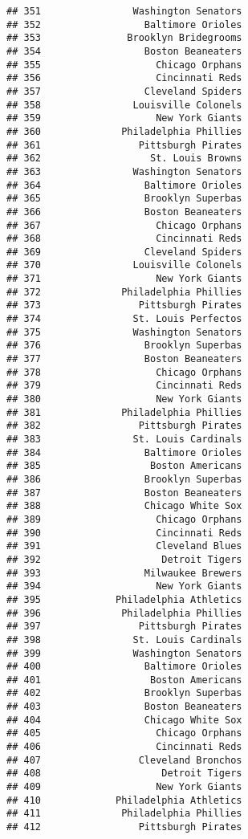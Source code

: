 \documentclass[]{article}
\begin{document}
\begin{verbatim}
## 351                Washington Senators
## 352                  Baltimore Orioles
## 353               Brooklyn Bridegrooms
## 354                  Boston Beaneaters
## 355                    Chicago Orphans
## 356                    Cincinnati Reds
## 357                  Cleveland Spiders
## 358                Louisville Colonels
## 359                    New York Giants
## 360              Philadelphia Phillies
## 361                 Pittsburgh Pirates
## 362                   St. Louis Browns
## 363                Washington Senators
## 364                  Baltimore Orioles
## 365                  Brooklyn Superbas
## 366                  Boston Beaneaters
## 367                    Chicago Orphans
## 368                    Cincinnati Reds
## 369                  Cleveland Spiders
## 370                Louisville Colonels
## 371                    New York Giants
## 372              Philadelphia Phillies
## 373                 Pittsburgh Pirates
## 374                St. Louis Perfectos
## 375                Washington Senators
## 376                  Brooklyn Superbas
## 377                  Boston Beaneaters
## 378                    Chicago Orphans
## 379                    Cincinnati Reds
## 380                    New York Giants
## 381              Philadelphia Phillies
## 382                 Pittsburgh Pirates
## 383                St. Louis Cardinals
## 384                  Baltimore Orioles
## 385                   Boston Americans
## 386                  Brooklyn Superbas
## 387                  Boston Beaneaters
## 388                  Chicago White Sox
## 389                    Chicago Orphans
## 390                    Cincinnati Reds
## 391                    Cleveland Blues
## 392                     Detroit Tigers
## 393                  Milwaukee Brewers
## 394                    New York Giants
## 395             Philadelphia Athletics
## 396              Philadelphia Phillies
## 397                 Pittsburgh Pirates
## 398                St. Louis Cardinals
## 399                Washington Senators
## 400                  Baltimore Orioles
## 401                   Boston Americans
## 402                  Brooklyn Superbas
## 403                  Boston Beaneaters
## 404                  Chicago White Sox
## 405                    Chicago Orphans
## 406                    Cincinnati Reds
## 407                 Cleveland Bronchos
## 408                     Detroit Tigers
## 409                    New York Giants
## 410             Philadelphia Athletics
## 411              Philadelphia Phillies
## 412                 Pittsburgh Pirates

\end{verbatim}
\end{document}
